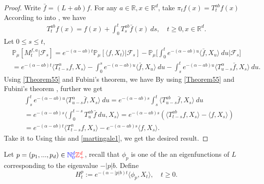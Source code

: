 \documentclass[12pt,oneside,english]{amsart}
\theoremstyle{plain}
\theoremstyle{definition}
\numberwithin{equation}{section}
\newcommand{\added}[1]{{\color{blue}#1}}\newcommand{\deleted}[1]{{\color{red}#1}}
\begin{document}
\begin{proof}
    \added{Write $\bar{f}=(L+ab)f$.} \deleted{For any $ a\in \mathbb{R},x\in \mathbb{R}^d$, take $\pi_tf(x)=T_t^{ab}f(x)$} \added{According to} \deleted{into} \cite[Theorem A.55]{Li2011Measure-valued}, we have
\begin{align}\label{Theorem55}
    T_t^{ab}f(x)= f(x)+\int_0^t T_s^{ab}\bar{f}(x)~ds,\quad t\geq 0,x\in \mathbb{R}^d.
\end{align}
Let $0\leq s\leq t$,
\begin{align}
\label{martingale1}
    &\mathbb{P}_{\mu}[M_t^{f,a}|\mathcal{F}_s]
    =e^{-(\alpha-ab)t}\mathbb{P}_{\mu}\left[\langle f,X_t\rangle|\mathcal{F}_s\right]-\mathbb{P}_{\mu}\Big[\int_0^t e^{-(\alpha-ab)u}\langle \bar{f}, X_u\rangle~ du\Big|\mathcal{F}_s\big]
    \\&=e^{-(\alpha-ab)t}\langle T_{t-s}^{\alpha}f, X_s\rangle-\int_0^s e^{-(\alpha-ab)u}\langle \bar{f}, X_u\rangle~ du -\int_s^t e^{-(\alpha-ab)u}\langle T_{u-s}^{\alpha} \bar{f},X_s\rangle~ du.
\end{align}
    \added{Using \eqref{Theorem55} and Fubini's theorem, we have}
    \deleted{By using \eqref{Theorem55} and Fubini's theorem , further we get}
\begin{align}
    &\int_s^t e^{-(\alpha-ab)u}\langle T_{u-s}^{\alpha} \bar{f},X_s\rangle~ du=e^{-(\alpha-ab)s}\int_s^t\langle T_{u-s}^{ab}\bar{f},X_s\rangle~du\\
    &=e^{-(\alpha-ab)s}\langle\int_0^{t-s}T_{u}^{ab}\bar{f}~du,X_s\rangle=e^{-(\alpha-ab)s}\left(\langle T_{t-s}^{ab}f,X_s\rangle-\langle
    f,X_s\rangle\right)\\
    &=e^{-(\alpha-ab)t}\langle T_{t-s}^{\alpha}f, X_s\rangle-e^{-(\alpha-ab)s}\langle
    f,X_s\rangle.
\end{align}
    \deleted{Take it to} \added{Using this and} \eqref{martingale1}, we get the desired result.
\end{proof}

    Let $p=(p_1,...,p_d)\in \added{\mathbb N_0^d} \deleted{\mathbb{Z}_+^d}$, recall that $\phi_p$ is \added{one of the} \deleted{an} eigenfunction\added{s} of $L$ corresponding to the eigenvalue $-|p|b$. Define
$$H_t^p:=e^{-(\alpha-|p|b)t}\langle\phi_p,X_t\rangle, \quad t\geq 0.$$
\end{document}
